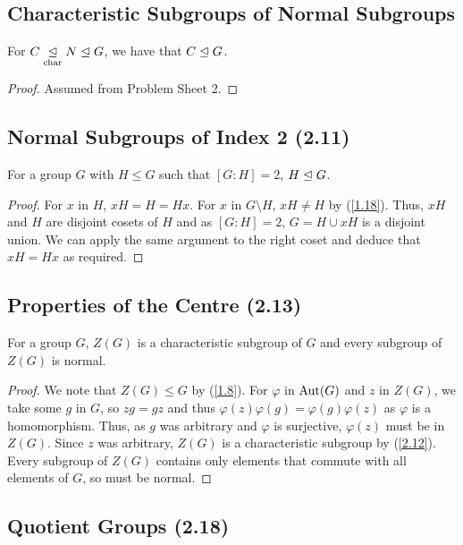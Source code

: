 \subsection{Characteristic Subgroups of Normal Subgroups}

For $C \underset{\text{char}}{\trianglelefteq} N \trianglelefteq G$, we have that $C \trianglelefteq G$.

\begin{proof}
    Assumed from Problem Sheet 2.
\end{proof}

\subsection{Normal Subgroups of Index 2 (2.11)} \label{2.11}

For a group $G$ with $H \leq G$ such that $[G : H] = 2$, $H \trianglelefteq G$.

\begin{proof}
    For $x$ in $H$, $xH = H = Hx$.
    For $x$ in $G \setminus H$, $xH \neq H$ by (\ref{1.18}).
    Thus, $xH$ and $H$ are disjoint cosets of $H$ and as $[G : H] = 2$, 
    $G = H \cup xH$ is a disjoint union. We can apply the same argument 
    to the right coset and deduce that $xH = Hx$ as required.
\end{proof}

\subsection{Properties of the Centre (2.13)} \label{2.13}

For a group $G$, $Z(G)$ is a characteristic subgroup of $G$ and every
subgroup of $Z(G)$ is normal.

\begin{proof}
    We note that $Z(G) \leq G$ by (\ref{1.8}). For $\varphi$ in $\operatorname{Aut}(G)$ and $z$
    in $Z(G)$, we take some $g$ in $G$, so $zg = gz$ and thus 
    $\varphi(z)\varphi(g) = \varphi(g)\varphi(z)$ as 
    $\varphi$ is a homomorphism. Thus, as $g$ was arbitrary and $\varphi$ is surjective, 
    $\varphi(z)$ must be in $Z(G)$. Since $z$ was arbitrary, $Z(G)$
    is a characteristic subgroup by (\ref{2.12}).
    Every subgroup of $Z(G)$ contains only elements that commute with
    all elements of $G$, so must be normal.
\end{proof}

\subsection{Quotient Groups (2.18)} \label{2.18}

